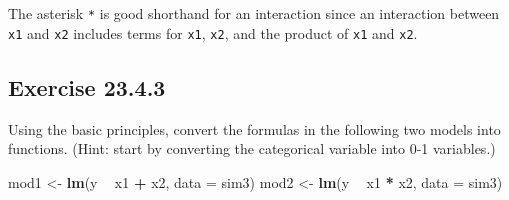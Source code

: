 \documentclass[]{book}
\newenvironment{Shaded}{\begin{snugshade}}{\end{snugshade}}
\newcommand{\ControlFlowTok}[1]{\textcolor[rgb]{0.13,0.29,0.53}{\textbf{#1}}}
\newcommand{\DataTypeTok}[1]{\textcolor[rgb]{0.13,0.29,0.53}{#1}}
\newcommand{\KeywordTok}[1]{\textcolor[rgb]{0.13,0.29,0.53}{\textbf{#1}}}
\newcommand{\NormalTok}[1]{#1}
\newcommand{\OperatorTok}[1]{\textcolor[rgb]{0.81,0.36,0.00}{\textbf{#1}}}
\newcommand{\StringTok}[1]{\textcolor[rgb]{0.31,0.60,0.02}{#1}}
\theoremstyle{plain}
\theoremstyle{remark}
\theoremstyle{definition}
\theoremstyle{definition}
\theoremstyle{definition}
\theoremstyle{remark}
\begin{document}
The asterisk \texttt{*} is good shorthand for an interaction since an
interaction between \texttt{x1} and \texttt{x2} includes terms for
\texttt{x1}, \texttt{x2}, and the product of \texttt{x1} and
\texttt{x2}.

\hypertarget{exercise-23.4.3}{%
\subsection*{\texorpdfstring{Exercise
{23.4.3}}{Exercise 23.4.3}}\label{exercise-23.4.3}}

Using the basic principles, convert the formulas in the following two
models into functions. (Hint: start by converting the categorical
variable into 0-1 variables.)

\begin{Shaded}
\begin{Highlighting}[]
\NormalTok{mod1 <-}\StringTok{ }\KeywordTok{lm}\NormalTok{(y }\OperatorTok{~}\StringTok{ }\NormalTok{x1 }\OperatorTok{+}\StringTok{ }\NormalTok{x2, }\DataTypeTok{data =}\NormalTok{ sim3)}
\NormalTok{mod2 <-}\StringTok{ }\KeywordTok{lm}\NormalTok{(y }\OperatorTok{~}\StringTok{ }\NormalTok{x1 }\OperatorTok{*}\StringTok{ }\NormalTok{x2, }\DataTypeTok{data =}\NormalTok{ sim3)}
\end{Highlighting}
\end{Shaded}

\begin{Shaded}
\end{Shaded}
\end{document}
